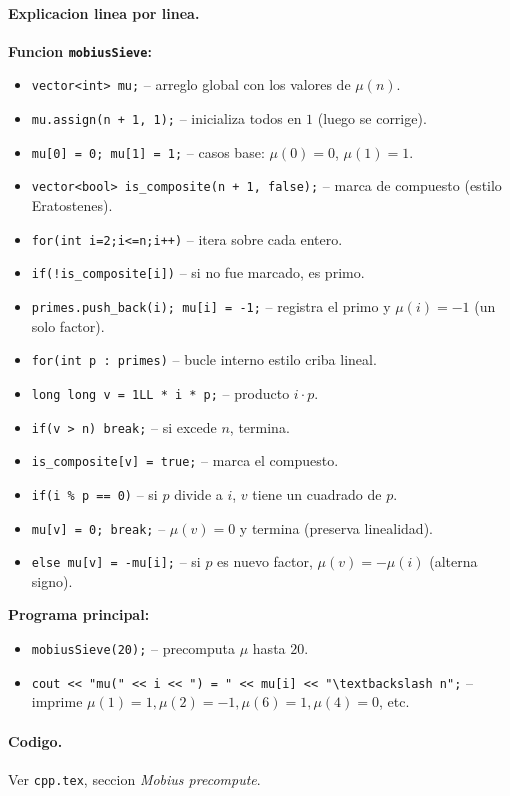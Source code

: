 \paragraph{Explicacion linea por linea.}
\textbf{Funcion \texttt{mobiusSieve}:}
\begin{itemize}\setlength\itemsep{0pt}
	\item \verb|vector<int> mu;| -- arreglo global con los valores de $\mu(n)$.
	\item \verb|mu.assign(n + 1, 1);| -- inicializa todos en $1$ (luego se corrige).
	\item \verb|mu[0] = 0; mu[1] = 1;| -- casos base: $\mu(0)=0$, $\mu(1)=1$.
	\item \verb|vector<bool> is_composite(n + 1, false);| -- marca de compuesto (estilo Eratostenes).
	\item \verb|for(int i=2;i<=n;i++)| -- itera sobre cada entero.
	\item \verb|if(!is_composite[i])| -- si no fue marcado, es primo.
	\item \verb|primes.push_back(i); mu[i] = -1;| -- registra el primo y $\mu(i) = -1$ (un solo factor).
	\item \verb|for(int p : primes)| -- bucle interno estilo criba lineal.
	\item \verb|long long v = 1LL * i * p;| -- producto $i \cdot p$.
	\item \verb|if(v > n) break;| -- si excede $n$, termina.
	\item \verb|is_composite[v] = true;| -- marca el compuesto.
	\item \verb|if(i % p == 0)| -- si $p$ divide a $i$, $v$ tiene un cuadrado de $p$.
	\item \verb|mu[v] = 0; break;| -- $\mu(v) = 0$ y termina (preserva linealidad).
	\item \verb|else mu[v] = -mu[i];| -- si $p$ es nuevo factor, $\mu(v) = -\mu(i)$ (alterna signo).
\end{itemize}
\textbf{Programa principal:}
\begin{itemize}\setlength\itemsep{0pt}
	\item \verb|mobiusSieve(20);| -- precomputa $\mu$ hasta $20$.
	\item \verb|cout << "mu(" << i << ") = " << mu[i] << "\textbackslash n";| -- imprime $\mu(1)=1, \mu(2)=-1, \mu(6)=1, \mu(4)=0$, etc.
\end{itemize}

\paragraph{Codigo.}
Ver \texttt{cpp.tex}, seccion \textit{Mobius precompute}.

\vspace{0.5em|||}
